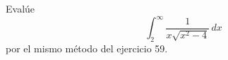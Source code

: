 \item Evalúe
    \[ \int_{2}^{\infty} \frac{1}{x\sqrt{x^2 - 4}} \, dx \]
    por el mismo método del ejercicio 59.
